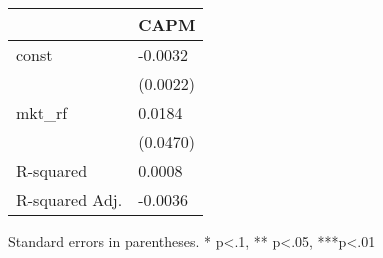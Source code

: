 \begin{table}
\caption{}
\label{}
\begin{center}
\begin{tabular}{ll}
\hline
               & CAPM      \\
\hline
const          & -0.0032   \\
               & (0.0022)  \\
mkt\_rf        & 0.0184    \\
               & (0.0470)  \\
R-squared      & 0.0008    \\
R-squared Adj. & -0.0036   \\
\hline
\end{tabular}
\end{center}
\end{table}
\bigskip
Standard errors in parentheses. \newline 
* p<.1, ** p<.05, ***p<.01